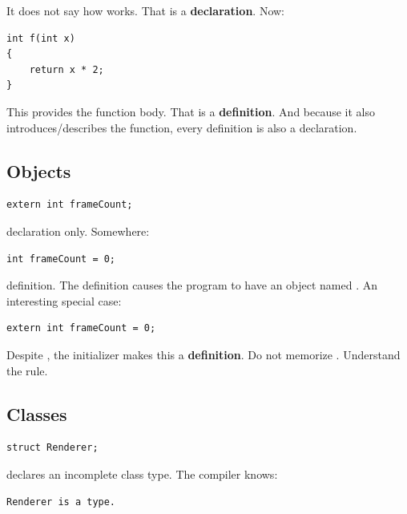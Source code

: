 It does not say how  works. That is a \textbf{declaration}. Now:

\begin{verbatim}
int f(int x)
{
    return x * 2;
}
\end{verbatim}

This provides the function body. That is a \textbf{definition}. And because it also introduces/describes the function, every definition is also a declaration.

\subsection{Objects}\label{05-engine-i-ch002-objects}

\hypertarget{05-engine-i-ch002-objects}{}

\begin{verbatim}
extern int frameCount;
\end{verbatim}

declaration only. Somewhere:

\begin{verbatim}
int frameCount = 0;
\end{verbatim}

definition. The definition causes the program to have an object named . An interesting special case:

\begin{verbatim}
extern int frameCount = 0;
\end{verbatim}

Despite , the initializer makes this a \textbf{definition}. Do not memorize . Understand the rule.

\subsection{Classes}\label{05-engine-i-ch002-classes}

\hypertarget{05-engine-i-ch002-classes}{}

\begin{verbatim}
struct Renderer;
\end{verbatim}

declares an incomplete class type. The compiler knows:

\begin{verbatim}
Renderer is a type.
\end{verbatim}

